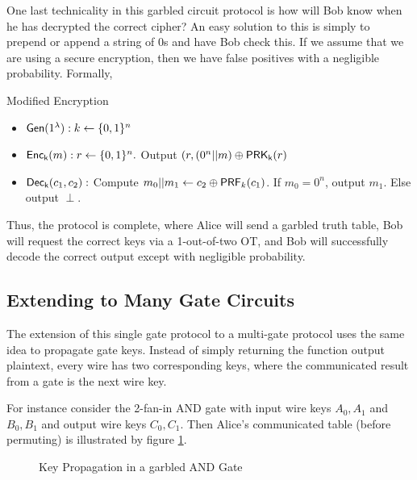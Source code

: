 One last technicality in this garbled circuit protocol is how will Bob know when he has decrypted the correct cipher? 
An easy solution to this is simply to prepend or append a string of 0s and have Bob check this. If we assume that we are using a secure encryption, then we have false positives with a negligible probability. Formally,
\begin{mdframed}[innertopmargin=5pt, skipabove=\topskip, skipbelow=\topskip,align=left,nobreak=true]
Modified Encryption
\begin{itemize}
    \item $\mathsf{Gen}(1^\lambda): k \leftarrow \{0,1\}^n$
    \item $\mathsf{Enc_k}(m): r \leftarrow \{0,1\}^n.$ Output $(r,(0^n || m) \oplus \mathsf{PRK_k}(r)$
    \item $\mathsf{Dec_k}(c_1,c_2):$ Compute $m_0||m_1 \leftarrow c_2 \oplus \mathsf{PRF}_k(c_1)$. If $m_0 = 0^n$, output $m_1.$ Else output $\perp.$
\end{itemize}
\end{mdframed}

Thus, the protocol is complete, where Alice will send a garbled truth table, Bob will request the correct keys via a 1-out-of-two OT, and Bob will successfully decode the correct output except with negligible probability.
\subsection{Extending to Many Gate Circuits}
The extension of this single gate protocol to a multi-gate protocol uses the same idea to propagate gate keys. 
Instead of simply returning the function output plaintext, every wire has two corresponding keys, where the communicated result from a gate is the next wire key.

For instance consider the 2-fan-in AND gate with input wire keys $A_0,A_1$ and $B_0,B_1$ and output wire keys $C_0,C_1.$ Then Alice's communicated table (before permuting) is illustrated by figure \ref{fig:garbAnd}.


\begin{figure}[!ht]
\centering
{}
\caption{Key Propagation in a garbled AND Gate}

\label{fig:garbAnd}
\end{figure}


